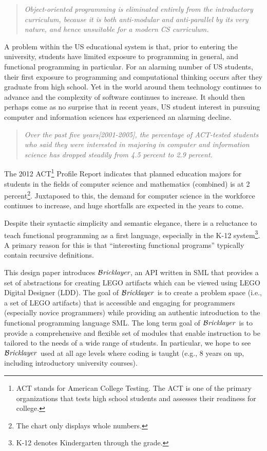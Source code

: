 \documentclass[submission,copyright,creativecommons]{eptcs}
\newcommand{\bricklayer}{\ensuremath{\mathcal{B}\emph{ricklayer}}}
\begin{document}
\begin{quote}
\emph{Object-oriented programming is eliminated entirely from the introductory curriculum, because it is both anti-modular and anti-parallel by its very nature, and hence unsuitable for a modern CS curriculum. \cite{existential-type}}
\end{quote}


A problem within the US educational system is that, prior to entering the university, students have limited exposure to programming in general, and functional programming in particular. For an alarming number of US students, their first exposure to programming and computational thinking occurs after they graduate from high school. Yet in the world around them technology continues to advance and the complexity of software continues to increase. It should then perhaps come as no surprise that in recent years, US student interest in pursuing computer and information sciences has experienced an alarming decline.

\begin{quote}
\emph{Over the past five years[2001-2005], the percentage of ACT-tested students who said they were interested in majoring in computer and information science has dropped steadily from 4.5 percent to 2.9 percent.} \cite{ACT:2006-STEM-Pipeline}
\end{quote}

The 2012 ACT\footnote{ACT stands for American College Testing. The ACT is one of the primary organizations that tests high school students and assesses their readiness for college.} Profile Report indicates that planned education majors for students in the fields of computer science and mathematics (combined) is at 2 percent\footnote{The chart only displays whole numbers.}. Juxtaposed to this, the demand for computer science in the workforce continues to increase, and huge shortfalls are expected in the years to come.

Despite their syntactic simplicity and semantic elegance, there is a reluctance to teach functional programming as a first language, especially in the K-12 system\footnote{K-12 denotes Kindergarten through the  grade.}. A primary reason for this is that ``interesting functional programs'' typically contain recursive definitions.



This design paper introduces \bricklayer, an API written in SML that provides a set of abstractions for creating LEGO artifacts which can be viewed using LEGO Digital Designer (LDD). The goal of \bricklayer\ is to create a problem space (i.e., a set of LEGO artifacts) that is accessible and engaging for programmers (especially novice programmers) while providing an authentic introduction to the functional programming language SML. The long term goal of \bricklayer\ is to provide a comprehensive and flexible set of modules that enable instruction to be tailored to the needs of a wide range of students. In particular, we hope to see \bricklayer\ used at all age levels where coding is taught (e.g., 8 years on up, including introductory university courses).
\end{document}
